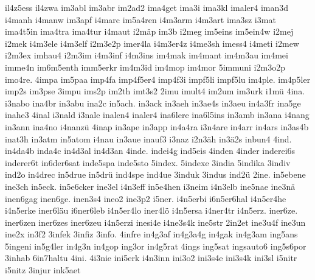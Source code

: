 {    il4z5ess
    il4zwa
    im3abl
    im3abr
    im2ad2
    ima4get
    ima3i
    ima3kl
    imaler4
    iman3d
    i4manh
    i4manw
    im3apf
    i4marc
    im5a4ren
    i4m3arm
    i4m3art
    ima3sz
    i3mat
    ima4t5in
    ima4tra
    ima4tur
    i4maut
    i2mäp
    im3b
    i2meg
    im5eins
    im5ein4w
    i2mej
    i2mek
    i4m3ele
    i4m3elf
    i2m3e2p
    imer4la
    i4m3er4z
    i4me3sh
    imess4
    i4meti
    i2mew
    i2m3ex
    imhau4
    i2m3im
    i4m3inf
    i4m3ins
    im4mak
    im4mant
    im4m3au
    im4mei
    imme4n
    im6m5enth
    imm5erkr
    im4m3id
    im4mop
    im4mor
    5immuni
    i2m3o2p
    imo4re.
    4impa
    im5paa
    imp4fa
    imp4f5er4
    imp4f3i
    impf5li
    impf5lu
    im4ple.
    im4p5ler
    imp2s
    im3pse
    3impu
    ims2p
    im2th
    imt3s2
    2imu
    imult4
    im2um
    im3urk
    i1mü
    4ina.
    i3nabo
    ina4br
    in3abu
    ina2c
    in5ach.
    in3ack
    in3aeh
    in3ae4s
    in3aeu
    in4a3fr
    ina5ge
    inahe3
    4inal
    i3nald
    i3nale
    inalen4
    inaler4
    ina6lere
    ina6l5ins
    in3amb
    in3ana
    i4nang
    in3ann
    ina4no
    i4nanzü
    4inap
    in3ape
    in3app
    in4a4ra
    i3n4are
    in4arr
    in4ars
    in3as4b
    inat3h
    in3atm
    in5atom
    i4nau
    in3aue
    inauf3
    i3naz
    i2n3äh
    in3ä2s
    inbun4
    4ind.
    in4da4b
    inda4c
    in4d3al
    in4d3an
    4inde.
    indei4g
    ind5eis
    4inden
    4inder
    inderei6s
    inderer6t
    in6der6sat
    inde5spa
    inde5sto
    5index.
    5indexe
    3india
    5indika
    3indiv
    ind2o
    in4drec
    in5drue
    in5drü
    ind4spe
    ind4ue
    3induk
    3indus
    ind2ü
    2ine.
    in5ebene
    ine3ch
    in5eck.
    in5e6cker
    ine3el
    i4n3eff
    in5e4hen
    i3neim
    i4n3elb
    ine5nae
    ine3nä
    inen6gag
    inen6ge.
    inen3s4
    ineo2
    ine3p2
    i5ner.
    i4n5erbi
    i6n5er6hal
    i4n5er4he
    i4n5erke
    iner6läu
    i6ner6leb
    i4n5er4lo
    iner4lö
    i4n5ersa
    i4ner4tr
    i4n5erz.
    iner6ze.
    iner6zen
    iner6zes
    iner6zeu
    i4n5erzi
    inesi4e
    i4ne3s4k
    ine5str
    2in2et
    ine3u4f
    ine3un
    ine2x
    in3f2
    3infek
    3infiz
    3info.
    4infre
    in4g3af
    in4g3a4g
    in4gak
    in4g3am
    ing5ans
    5ingeni
    in5g4ler
    in4g3n
    in4gop
    ing3or
    in4g5rat
    4ings
    ing5sat
    ingsauto6
    ing5s6por
    3inhab
    6in7haltu
    4ini.
    4i3nie
    ini5erk
    i4n3inn
    ini3o2
    ini3s4e
    ini3s4k
    ini3sl
    i5nitr
    i5nitz
    3injur
    ink5aet
}

